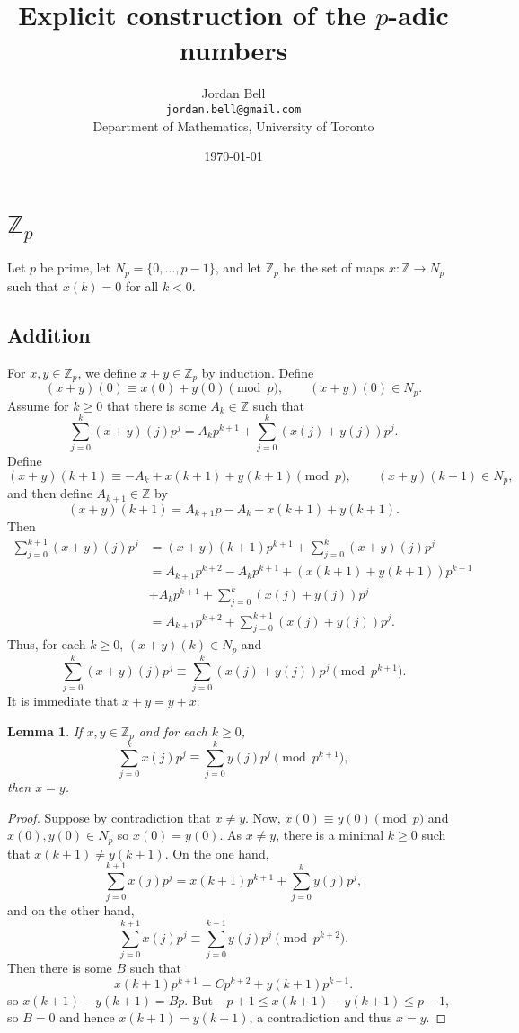 \documentclass{article}
\newtheorem{lemma}[theorem]{Lemma}
\theoremstyle{definition}
\begin{document}
\title{Explicit construction of the $p$-adic numbers}
\author{Jordan Bell\\ \texttt{jordan.bell@gmail.com}\\Department of Mathematics, University of Toronto}
\date{\today}

\maketitle

\section{$\mathbb{Z}_p$}
Let $p$ be prime, let $N_p = \{0,\ldots,p-1\}$, and
let $\mathbb{Z}_p$ be the set of maps $x:\mathbb{Z} \to N_p$ such that $x(k)=0$ for all $k<0$. 




\subsection{Addition}
For $x,y \in \mathbb{Z}_p$,
we define $x+y \in \mathbb{Z}_p$ by induction. Define
\[
(x+y)(0) \equiv x(0)+y(0) \pmod{p}, \qquad (x+y)(0) \in N_p.
\]
Assume  for  $k \geq 0$ that there is some 
$A_k \in \mathbb{Z}$ such that
\[
\sum_{j=0}^k (x+y)(j) p^j = A_k p^{k+1} +  \sum_{j=0}^k (x(j)+y(j))p^j.
\]
Define
\[
(x+y)(k+1) \equiv -A_k + x(k+1)+y(k+1) \pmod{p},\qquad (x+y)(k+1) \in N_p,
\]
and then define
$A_{k+1} \in \mathbb{Z}$ by
\[
(x+y)(k+1)= A_{k+1} p - A_k + x(k+1)+y(k+1).
\] 
Then
\begin{align*}
\sum_{j=0}^{k+1}(x+y)(j) p^j &=(x+y)(k+1) p^{k+1} + \sum_{j=0}^k (x+y)(j) p^j\\
&= A_{k+1} p^{k+2} - A_k p^{k+1} + (x(k+1)+y(k+1))p^{k+1}\\
&+A_k p^{k+1} +  \sum_{j=0}^k (x(j)+y(j))p^j\\
&=A_{k+1} p^{k+2} + \sum_{j=0}^{k+1}  (x(j)+y(j))p^j.
\end{align*}
Thus, for each $k \geq 0$, $(x+y)(k) \in N_p$ and 
\begin{equation}
\sum_{j=0}^k (x+y)(j) p^j \equiv \sum_{j=0}^k (x(j)+y(j)) p^j \pmod{p^{k+1}}.
\label{addition}
\end{equation}
It is immediate that $x+y=y+x$.

\begin{lemma}
If $x,y \in \mathbb{Z}_p$ and for each $k \geq 0$,  
\[
\sum_{j=0}^k x(j) p^j \equiv \sum_{j=0}^k y(j) p^j \pmod{p^{k+1}},
\]
then $x=y$.
\end{lemma}
\begin{proof}
Suppose by contradiction that $x \neq y$. Now, $x(0) \equiv y(0) \pmod{p}$
and $x(0),y(0) \in N_p$ so $x(0)=y(0)$. As $x \neq y$, there is  a minimal $k \geq 0$ such that  
$x(k+1) \neq y(k+1)$. On the one hand, 
\[
\sum_{j=0}^{k+1} x(j) p^j = x(k+1) p^{k+1} + \sum_{j=0}^k y(j) p^j,
\]
and on the other hand,
\[
\sum_{j=0}^{k+1} x(j) p^j  \equiv \sum_{j=0}^{k+1} y(j) p^j \pmod{p^{k+2}}.
\]
Then there is some $B$ such that 
\[
x(k+1)p^{k+1} =Cp^{k+2}+ y(k+1) p^{k+1}.
\]
so $x(k+1) - y(k+1) = Bp$. But $-p+1 \leq x(k+1)-y(k+1) \leq p-1$, so $B=0$ and hence
$x(k+1)=y(k+1)$, a contradiction and thus $x=y$.
\end{proof}
\end{document}
